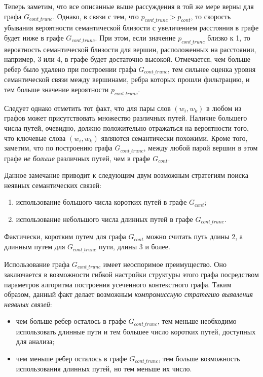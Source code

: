 Теперь заметим, что все описанные выше рассуждения в той же мере верны для графа $G_{cont\_trunc}$. Однако, в связи с тем, что $p_{cont\_trunc} > p_{cont}$, то скорость убывания вероятности семантической близости с увеличением расстояния в графе будет ниже в графе $G_{cont\_trunc}$. При этом, если значение $p_{cont\_trunc}$ близко к 1, то вероятность семантической близости для вершин, расположенных на расстоянии, например, 3 или 4, в графе будет достаточно высокой. Отмечается, чем больше ребер было удалено при построении графа $G_{cont\_trunc}$, тем сильнее оценка уровня семантической связи между вершинами, ребра которых прошли фильтрацию, и тем больше значение вероятности $p_{cont\_trunc}$. 

Следует однако отметить тот факт, что для пары слов $(w_i, w_k)$ в любом из графов может присутствовать множество различных путей. Наличие большего числа путей, очевидно, должно положительно отражаться на вероятности того, что ключевые слова $(w_i, w_k)$ являются семантически похожими. Кроме того, заметим, что по построению графа $G_{cont\_trunc}$, между любой парой вершин в этом графе \emph{не больше} различных путей, чем в графе $G_{cont}$.

Данное замечание приводит к следующим двум возможным стратегиям поиска неявных семантических связей:
\begin{enumerate}
    \item использование большого числа коротких путей в графе $G_{cont}$; 
    \item использование небольшого числа длинных путей в графе $G_{cont\_trunc}$. 
\end{enumerate}

Фактически, коротким путем для графа $G_{cont}$ можно считать путь длины 2, а длинным путем для $G_{cont\_trunc}$ пути, длины 3 и более.

Использование графа $G_{cont\_trunc}$ имеет неоспоримое преимущество. Оно заключается в возможности гибкой настройки структуры этого графа посредством параметров алгоритма построения усеченного контекстного графа. Таким образом, данный факт делает возможным \emph{компромиссную стратегию выявления неявных связей}:
\begin{itemize} 
    \item чем больше ребер осталось в графе $G_{cont\_trunc}$, тем меньше необходимо использовать длинные пути и тем большее число коротких путей, доступных для анализа;
    \item чем меньше ребер осталось в графе $G_{cont\_trunc}$, тем больше возможность использования длинных путей, но тем меньше их число.
\end{itemize}


